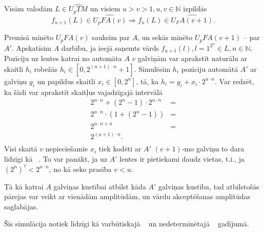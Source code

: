 \documentclass{ludis}
\begin{document}
\begin{lemma} \label{plus1}
Visām valodām $L \in \widehat{U_pTM}$ un visiem $u > v > 1, u, v \in \mathbb{N}$ izpildās
\[
	f_{u+1}(L) \in \widehat{U_pFA(v)} \Rightarrow f_u(L) \in \widehat{U_FA(v + 1)}.
\]
\end{lemma}
\begin{pieradijums}
Premisā minēto $U_pFA(v)$ sauksim par $A$, un sekās minēto $U_pFA(v + 1)$ -- par $A'$.
Apskatīsim $A$ darbību, ja ieejā saņemts vārds $f_{u+1}(l), l = 1^{2^n} \in L, n \in \mathbb{N}$. Pozīciju uz lentes katrai no automāta $A$ $v$ galviņām var aprakstīt naturālu ar skaitli $h_i$ robežās $h_i \in \left[0, 2^{(u + 1) \cdot n} + 1 \right]$. Simulēsim $h_i$ pozīciju automātā $A'$ ar galviņu $g_i$ un papildus skaitli $x_i \in \left[ 0, 2^n \right]$, tā, ka $h_i = g_i + x_i \cdot 2^{u \cdot n}$. Var redzēt, ka šādi var aprakstīt skaitļus vajadzīgajā intervālā
\begin{align*}
	2^{u \cdot n} + (2^n - 1) \cdot 2^{u \cdot n} & =\\
	2^{u \cdot n} \cdot (1 + (2^n - 1)) & =\\
	2^{u \cdot n + n} & =\\
	2^{(u + 1) \cdot n}.\\
\end{align*}
Visi skaitā $v$ nepieciešamie $x_i$ tiek kodēti ar $A'$ $(v+1)$-mo galviņu to dara līdzīgi kā ~\citep{Monien1980}.
To var panākt, ja uz $A'$ lentes ir pietiekami daudz vietas, t.i., ja $(2^n)^v < 2^{u \cdot n}$, no kā seko prasība $v < u$.

Tā kā katrai $A$ galviņas kustībai atbilst kāda $A'$ galviņas kustība, tad atbilstošās pārejas var veikt ar vienādām amplitūdām, un vārdu akceptēšanas amplitūdas saglabājas.

Šīs simulācija notiek līdzīgi kā varbūtiskajā ~\citep{Macarie1995} un nedeterminētajā ~\citep{Monien1980} gadījumā.
\end{pieradijums}
\end{document}
